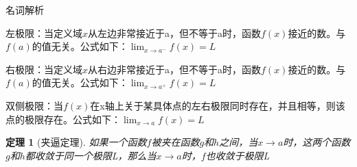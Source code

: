 \documentclass[UTF8,fontset=ubuntu]{ctexart}
\begin{document}
名词解析\par
左极限：当定义域$x$从左边非常接近于a，但不等于a时，函数$f(x)$接近的数。与$f(a)$的值无关。公式如下：$\lim_{x\to a^-}f(x)=L$

右极限：当定义域$x$从右边非常接近于a，但不等于a时，函数$f(x)$接近的数。与$f(a)$的值无关。公式如下：$\lim_{x\to a^+}f(x)=L$

双侧极限：当$f(x)$在x轴上关于某具体点的左右极限同时存在，并且相等，则该点的极限存在。公式如下：$\lim_{x\to a}f(x)=L$

\newtheorem{theorem}{定理}
\begin{theorem}[夹逼定理]
	如果一个函数$f$被夹在函数$g$和$h$之间，当$x\rightarrow a$时，这两个函数$g$和$h$都收敛于同一个极限L，那么当$x\rightarrow a$时，$f$也收敛于极限L
\end{theorem}
\end{document}
